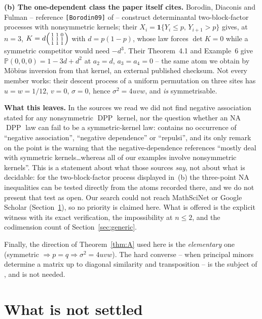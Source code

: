 \documentclass[11pt]{amsart}
\theoremstyle{remark}
\DeclareMathOperator{\DPP}{DPP}
\begin{document}
\medskip
\noindent\textbf{(b) The one-dependent class the paper itself cites.} Borodin, Diaconis and
Fulman \cite{BDF} -- reference \texttt{[Borodin09]} of \cite{Poinas} -- construct
determinantal two-block-factor processes with nonsymmetric kernels; their
$X_{i}=\mathbf 1\{Y_{i}\le p,\,Y_{i+1}>p\}$ gives, at $n=3$,
$K=d\begin{psmallmatrix}1&1&0\\1&1&1\\1&1&1\end{psmallmatrix}$ with $d=p(1-p)$, whose law
forces $\det K=0$ while a symmetric competitor would need $-d^{3}$. Their Theorem~4.1 and
Example~6 give $\mathbb P(0,0,0)=1-3d+d^{2}$ at $a_{2}=d$, $a_{3}=a_{4}=0$ -- the same atom we
obtain by M\"obius inversion from that kernel, an external published checksum. Not every
member works: their descent process of a uniform permutation on three sites has $u=w=1/12$,
$v=0$, $\sigma=0$, hence $\sigma^{2}=4uvw$, and \emph{is} symmetrisable.

\medskip
\noindent\textbf{What this leaves.} In the sources we read we did not find negative
association stated for any nonsymmetric $\DPP$ kernel, nor the question whether an NA $\DPP$
law can fail to be a symmetric-kernel law: \cite{BDF} contains no occurrence of ``negative
association'', ``negative dependence'' or ``repulsi'', and its only remark on the point is the
warning that the negative-dependence references ``mostly deal with symmetric
kernels\ldots whereas all of our examples involve nonsymmetric kernels''. This is a statement
about what those sources \emph{say}, not about what is decidable: for the two-block-factor
process displayed in~(b) the three-point NA inequalities can be tested directly from the atoms
recorded there, and we do not present that test as open. Our search could not
reach MathSciNet or Google Scholar (Section~\ref{sec:open}), so no priority is claimed here.
What is offered is the explicit witness with its exact verification, the impossibility at
$n\le2$, and the codimension count of Section~\ref{sec:generic}.

Finally, the direction of Theorem~\ref{thm:A} used here is the \emph{elementary} one
(symmetric $\Rightarrow p=q\Rightarrow\sigma^{2}=4uvw$). The hard converse -- when principal
minors determine a matrix up to diagonal similarity and transposition -- is the subject of
\cite{Loewy,Stevens,Mantelos,Arvind}, and is not needed.

\section{What is not settled}\label{sec:open}
\end{document}
